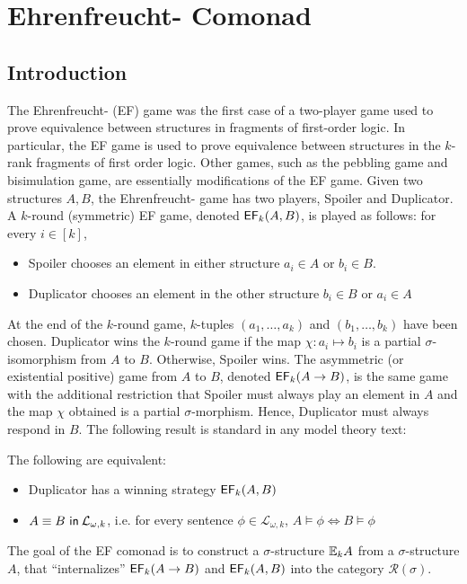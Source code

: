\chapter{Ehrenfreucht-{\Fraisse} Comonad}
\section{Introduction}
The Ehrenfreucht-{\Fraisse} (EF) game was the first case of a two-player game used to prove equivalence between structures in fragments of first-order logic. In particular, the EF game is used to prove equivalence between structures in the $k$-rank fragments of first order logic. Other games, such as the pebbling game and bisimulation game, are essentially modifications of the EF game. Given two structures $A,B$, the Ehrenfreucht-{\Fraisse} game has two players, Spoiler and Duplicator. A $k$-round (symmetric) EF game, denoted ${\mathsf{EF}_{k}(A,B)}$, is played as follows: for every $i \in [k]$, 
\begin{itemize}
\item Spoiler chooses an element in either structure $a_{i} \in A$ or $b_{i} \in B$. 
\item Duplicator chooses an element in the other structure $b_{i} \in B$ or $a_{i} \in A$  
\end{itemize}
At the end of the $k$-round game, $k$-tuples $(a_{1},\dots,a_{k})$ and $(b_{1},\dots,b_{k})$ have been chosen. Duplicator wins the $k$-round game if the map $\chi:a_{i} \longmapsto b_{i}$ is a partial $\sigma$-isomorphism from $A$ to $B$. Otherwise, Spoiler wins. The asymmetric (or existential positive) game from $A$ to $B$, denoted ${\mathsf{EF}_{k}(A \rightarrow B)}$, is the same game with the additional restriction that Spoiler must always play an element in $A$ and the map $\chi$ obtained is a partial $\sigma$-morphism. Hence, Duplicator must always respond in $B$. The following result is standard in any model theory text:
\begin{prop}
The following are equivalent:
\begin{itemize}
\item Duplicator has a winning strategy ${\mathsf{EF}_{k}(A,B)}$
\item ${A \equiv B \ \mathsf{in}\: \mathcal{L}_{\omega,k}}$, i.e. for every sentence $\phi \in \mathcal{L}_{\omega,k}$, $A \vDash \phi \Leftrightarrow B \vDash \phi$
\end{itemize}
\end{prop}
The goal of the EF comonad is to construct a $\sigma$-structure ${\mathbb{E}_{k}A}$ from a $\sigma$-structure $A$, that ``internalizes'' ${\mathsf{EF}_{k}(A \rightarrow B)}$ and ${\mathsf{EF}_{k}(A,B)}$ into the category $\mathcal{R}(\sigma)$.  
